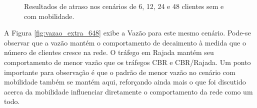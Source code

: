 \documentclass[12pt]{article}
\begin{document}
\begin{figure}[!ht]
	\centering
	\caption{Resultados de atraso nos cenários de 6, 12, 24 e 48 clientes sem e com mobilidade.}
	\label{fig:atraso_extra}
\end{figure}

A Figura \ref{fig:vazao_extra_648} exibe a Vazão para este mesmo cenário. Pode-se observar que a vazão mantém o comportamento de decaimento à medida que o número de clientes cresce na rede. O tráfego em Rajada mantém seu comportamento de menor vazão que os tráfegos CBR e CBR/Rajada. Um ponto importante para observação é que o padrão de menor vazão no cenário com mobilidade também se mantém aqui, reforçando ainda mais o que foi discutido acerca da mobilidade influenciar diretamente o comportamento da rede como um todo.
\end{document}
